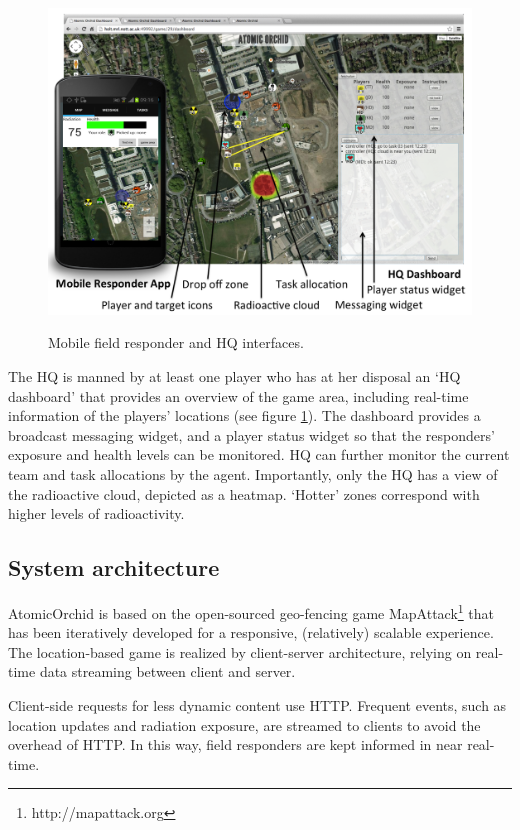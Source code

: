 \begin{figure}[htbp]
\includegraphics[width=\columnwidth]{UI.png}
\label{fig:ui}
\caption{Mobile field responder and HQ interfaces.}
\end{figure}

The HQ is manned by at least one player who has at her disposal an `HQ dashboard' that provides an overview of the game area, including real-time information of the players' locations (see figure \ref{fig:ui}). The dashboard provides a broadcast messaging widget, and a player status widget so that the responders' exposure and health levels can be monitored. HQ can further monitor the  current team and task allocations by the agent. Importantly, only the HQ has a view of the radioactive cloud, depicted as a heatmap. `Hotter' zones correspond with higher levels of radioactivity.

\subsection{System architecture}
AtomicOrchid is based on the open-sourced geo-fencing game MapAttack\footnote{http://mapattack.org} that has been iteratively developed for a responsive, (relatively) scalable experience.  The location-based game is realized by client-server architecture, relying on real-time data streaming between client and server.

Client-side requests for less dynamic content use HTTP. Frequent events, such as location updates and radiation exposure, are streamed to clients to avoid the overhead of HTTP. In this way, field responders are kept informed in near real-time.

